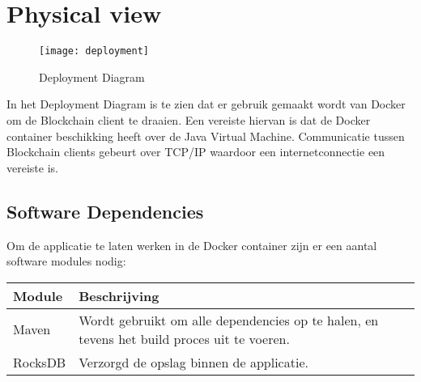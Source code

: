 \section{Physical view}

\begin{figure}[h]
  \centering
  \texttt{[image: deployment]}
  \caption{Deployment Diagram}
  \label{model:deployment}
\end{figure}

In het Deployment Diagram is te zien dat er gebruik gemaakt wordt van Docker om de Blockchain client te draaien. Een vereiste hiervan is dat de Docker container beschikking heeft over de Java Virtual Machine. Communicatie tussen Blockchain clients gebeurt over TCP/IP waardoor een internetconnectie een vereiste is.

\subsection{Software Dependencies}

Om de applicatie te laten werken in de Docker container zijn er een aantal software modules nodig:

\begin{tabular}{|p{3cm}|p{10cm}|}
  \hline
  \textbf{Module} & \textbf{Beschrijving} \\
  \hline
  Maven & Wordt gebruikt om alle dependencies op te halen, en tevens het build proces uit te voeren. \\
  \hline
  RocksDB & Verzorgd de opslag binnen de applicatie. \\
  \hline
\end{tabular}